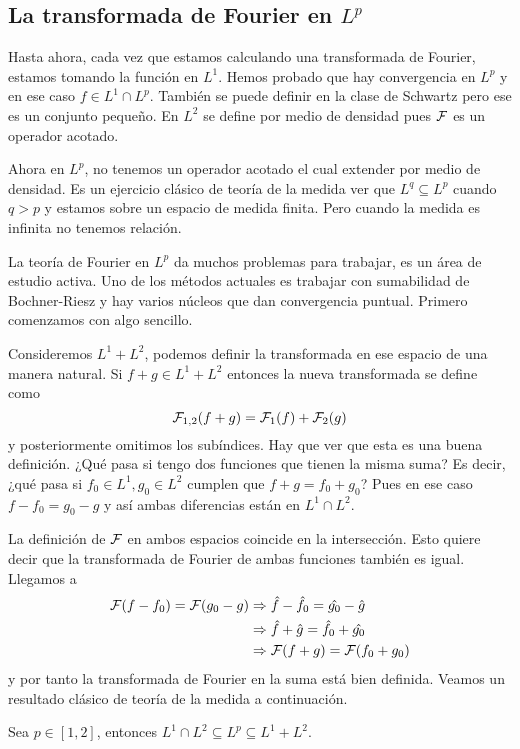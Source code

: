 \documentclass[12pt]{memoir}
\begin{document}
\subsection{La transformada de Fourier en $L^p$}
Hasta ahora, cada vez que estamos calculando una transformada de Fourier, estamos tomando la función en $L^1$. Hemos probado que hay convergencia en $L^p$ y en ese caso $f\in L^1\cap L^p$. También se puede definir en la clase de Schwartz pero ese es un conjunto pequeño. En $L^2$ se define por medio de densidad pues $\mathcal{F}$ es un operador acotado.\par 
Ahora en $L^p$, no tenemos un operador acotado el cual extender por medio de densidad. Es un ejercicio clásico de teoría de la medida ver que $L^q\subseteq L^p$ cuando $q>p$ y estamos sobre un espacio de medida finita. Pero cuando la medida es infinita no tenemos relación.\par 
La teoría de Fourier en $L^p$ da muchos problemas para trabajar, es un área de estudio activa. Uno de los métodos actuales es trabajar con sumabilidad de Bochner-Riesz y hay varios núcleos que dan convergencia puntual. Primero comenzamos con algo sencillo.\par 
Consideremos $L^1+L^2$, podemos definir la transformada en ese espacio de una manera natural. Si $f+g\in L^1+L^2$ entonces la nueva transformada se define como
$$\mathcal{F}_{1,2}(f+g)=\mathcal{F}_1(f)+\mathcal{F}_2(g)$$
y posteriormente omitimos los subíndices. Hay que ver que esta es una buena definición. ¿Qué pasa si tengo dos funciones que tienen la misma suma? Es decir, ¿qué pasa si $f_0\in L^1, g_0\in L^2$ cumplen que $f+g=f_0+g_0$? Pues en ese caso $f-f_0=g_0-g$ y así ambas diferencias están en $L^1\cap L^2$.\par 
La definición de $\mathcal{F}$ en ambos espacios coincide en la intersección. Esto quiere decir que la transformada de Fourier de ambas funciones también es igual. Llegamos a 
\begin{align*}
  \mathcal{F}(f-f_0)=\mathcal{F}(g_0-g)&  \Rightarrow \hat{f}-\hat{f_0}=\hat{g_0}-\hat{g}\\
  &\Rightarrow \hat{f}+\hat g=\hat{f_0}+\hat{g_0}\\
  &\Rightarrow\mathcal{F}(f+g)=\mathcal{F}(f_0+g_0)
\end{align*}
y por tanto la transformada de Fourier en la suma está bien definida. Veamos un resultado clásico de teoría de la medida a continuación.

\begin{Th}
  Sea $p\in[1,2]$, entonces $L^1\cap L^2\subseteq L^p\subseteq L^1+L^2$.
\end{Th}
\end{document}
